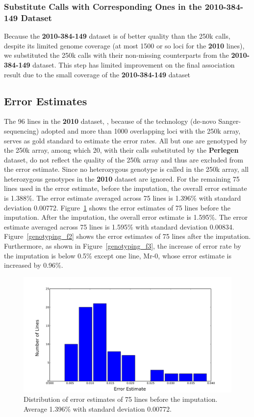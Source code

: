 \documentclass[a4paper,10pt]{article}
\begin{document}
\subsubsection{Substitute Calls with Corresponding Ones in the \textbf{2010-384-149} Dataset}
Because the \textbf{2010-384-149} dataset is of better quality than the 250k calls, despite its limited genome coverage (at most 1500 or so loci for the \textbf{2010} lines), we substituted the 250k calls with their non-missing counterparts from the \textbf{2010-384-149} dataset. This step has limited improvement on the final association result due to the small coverage of the \textbf{2010-384-149} dataset

\subsection{Error Estimates}

The 96 lines in the \textbf{2010} dataset, \cite{Nordborg2005}, because of the technology (de-novo Sanger-sequencing) adopted and more than 1000 overlapping loci with the 250k array, serves as gold standard to estimate the error rates. All but one are genotyped by the 250k array, among which 20, with their calls substituted by the \textbf{Perlegen} dataset, do not reflect the quality of the 250k array and thus are excluded from the error estimate. Since no heterozygous genotype is called in the 250k array, all heterozygous genotypes in the \textbf{2010} dataset are ignored. For the remaining 75 lines used in the error estimate, before the imputation, the overall error estimate is 1.388\%. The error estimate averaged across 75 lines is 1.396\% with standard deviation 0.00772. Figure~\ref{genotyping_f1} shows the error estimates of 75 lines before the imputation. After the imputation, the overall error estimate is 1.595\%. The error estimate averaged across 75 lines is 1.595\% with standard deviation 0.00834. Figure~\ref{genotyping_f2} shows the error estimates of 75 lines after the imputation. Furthermore, as shown in Figure~\ref{genotyping_f3}, the increase of error rate by the imputation is below 0.5\% except one line, Mr-0, whose error estimate is increased by 0.96\%.

\begin{figure}
  \includegraphics[width=1.0\textwidth]{figures/call_method_35_vs_2010_mismatch_rate_hist.png}
  \caption{Distribution of error estimates of 75 lines before the imputation. Average 1.396\% with standard deviation 0.00772.}\label{genotyping_f1}
\end{figure}
\end{document}
